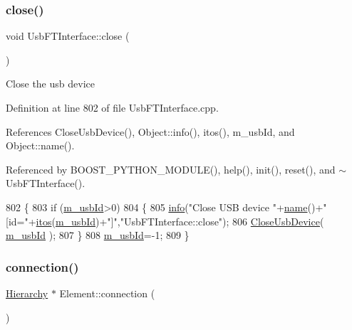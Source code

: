 \subsubsection{\texorpdfstring{close()}{close()}}
{\footnotesize\ttfamily void Usb\+F\+T\+Interface\+::close (\begin{DoxyParamCaption}{ }\end{DoxyParamCaption})}

Close the usb device 

Definition at line 802 of file Usb\+F\+T\+Interface.\+cpp.



References Close\+Usb\+Device(), Object\+::info(), itos(), m\+\_\+usb\+Id, and Object\+::name().



Referenced by B\+O\+O\+S\+T\+\_\+\+P\+Y\+T\+H\+O\+N\+\_\+\+M\+O\+D\+U\+L\+E(), help(), init(), reset(), and $\sim$\+Usb\+F\+T\+Interface().


\begin{DoxyCode}
802                              \{
803   \textcolor{keywordflow}{if} (\hyperlink{classUsbFTInterface_a91df5c0547e8be460bc087e27afe05aa}{m\_usbId}>0)
804   \{    
805     \hyperlink{classObject_a644fd329ea4cb85f54fa6846484b84a8}{info}(\textcolor{stringliteral}{"Close USB device "}+\hyperlink{classObject_a300f4c05dd468c7bb8b3c968868443c1}{name}()+\textcolor{stringliteral}{" [id="}+\hyperlink{Tools_8h_af330027dbdafb9a30768b3613c553e60}{itos}(\hyperlink{classUsbFTInterface_a91df5c0547e8be460bc087e27afe05aa}{m\_usbId})+\textcolor{stringliteral}{"]"},\textcolor{stringliteral}{"UsbFTInterface::close"});
806     \hyperlink{LALUsbML_8h_a3f0a3f9e09951c39ae1df0638008875a}{CloseUsbDevice}( \hyperlink{classUsbFTInterface_a91df5c0547e8be460bc087e27afe05aa}{m\_usbId} );
807   \}
808   \hyperlink{classUsbFTInterface_a91df5c0547e8be460bc087e27afe05aa}{m\_usbId}=-1;
809 \}
\end{DoxyCode}
\mbox{\label{classElement_af57444353c1ddf9fa0109801e97debf7}} 
\subsubsection{\texorpdfstring{connection()}{connection()}}
{\footnotesize\ttfamily \hyperlink{classHierarchy}{Hierarchy} $\ast$ Element\+::connection (\begin{DoxyParamCaption}{ }\end{DoxyParamCaption})\hspace{0.3cm}{\ttfamily [inherited]}}

